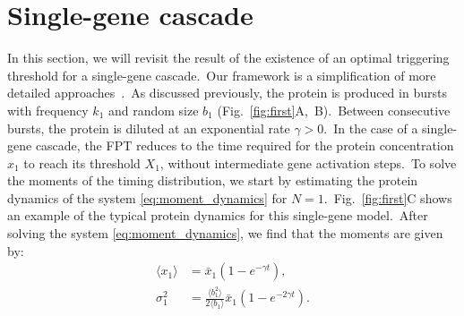 \documentclass[aps,prb,reprint,superscriptaddress]{revtex4-2}
\begin{document}






\section{Single-gene cascade}\label{section3}


In this section, we will revisit the result of the existence of an optimal triggering threshold for a single-gene cascade.~Our framework is a simplification of more detailed approaches~\cite{co2017stochastic, kannoly2020optimum, ghusinga2017first, rijal2022exact}.~As discussed previously, the protein is produced in bursts with frequency $k_1$ and random size $b_1$ (Fig.~\ref{fig:first}A,~B).~Between consecutive bursts, the protein is diluted at an exponential rate $\gamma>0$.~In the case of a single-gene cascade, the FPT reduces to the time required for the protein concentration $x_1$ to reach its threshold $X_1$, without intermediate gene activation steps.~To solve the moments of the timing distribution, we start by estimating the protein dynamics of the system \eqref{eq:moment_dynamics} for $N=1$.~Fig.~\ref{fig:first}C shows an example of the typical protein dynamics for this single-gene model.~After solving the system \eqref{eq:moment_dynamics}, we find that the moments are given by:
\begin{subequations}
\begin{align}\label{mean_protein}
    \langle x_1 \rangle&=\bar{x}_1\left(1 - e^{-\gamma t}\right),\\
    \sigma^2_1 &= \frac{\langle b_1^2 \rangle}{2\langle b_1 \rangle}\bar{x}_{1}\left(1-e^{-2\gamma t}\right).\label{variance_single}
\end{align}
\end{subequations}
\end{document}
